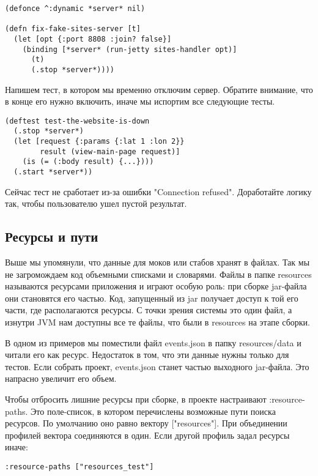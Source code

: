 \begin{verbatim}
(defonce ^:dynamic *server* nil)

(defn fix-fake-sites-server [t]
  (let [opt {:port 8808 :join? false}]
    (binding [*server* (run-jetty sites-handler opt)]
      (t)
      (.stop *server*))))
\end{verbatim}

Напишем тест, в котором мы временно отключим сервер. Обратите внимание, что в
конце его нужно включить, иначе мы испортим все следующие тесты.

\begin{verbatim}
(deftest test-the-website-is-down
  (.stop *server*)
  (let [request {:params {:lat 1 :lon 2}}
        result (view-main-page request)]
    (is (= (:body result) {...})))
  (.start *server*))
\end{verbatim}

Сейчас тест не сработает из-за ошибки "Connection refused". Доработайте логику
так, чтобы пользователю ушел пустой результат.

\subsection{Ресурсы и пути}

Выше мы упомянули, что данные для моков или стабов хранят в файлах. Так мы не
загромождаем код объемными списками и словарями. Файлы в папке resources
называются ресурсами приложения и играют особую роль: при сборке jar-файла они
становятся его частью. Код, запущенный из jar получает доступ к той его части,
где располагаются ресурсы. С точки зрения системы это один файл, а изнутри JVM
нам доступны все те файлы, что были в resources на этапе сборки.

В одном из примеров мы поместили файл events.json в папку resources/data и
читали его как ресурс. Недостаток в том, что эти данные нужны только для
тестов. Если собрать проект, events.json станет частью выходного jar-файла. Это
напрасно увеличит его объем.

Чтобы отбросить лишние ресурсы при сборке, в проекте настраивают
:resource-paths. Это поле-список, в котором перечислены возможные пути поиска
ресурсов. По умолчанию оно равно вектору ["resources"]. При объединении профилей
вектора соединяются в один. Если другой профиль задал ресурсы иначе:

\begin{verbatim}
:resource-paths ["resources_test"]
\end{verbatim}

